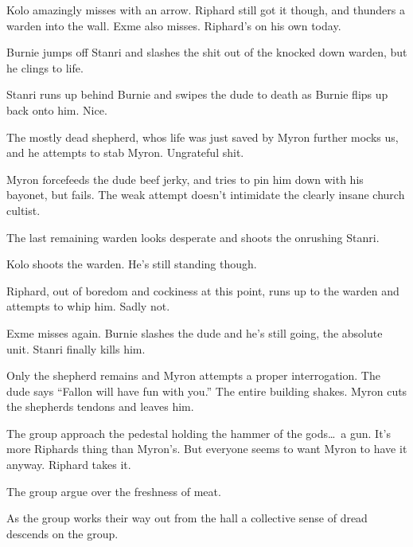 Kolo amazingly misses with an arrow. Riphard still got it though, and thunders a warden into the wall. Exme also misses. Riphard's on his own today.\medskip

Burnie jumps off Stanri and slashes the shit out of the knocked down warden, but he clings to life.\medskip

Stanri runs up behind Burnie and swipes the dude to death as Burnie flips up back onto him. Nice.\medskip

The mostly dead shepherd, whos life was just saved by Myron further mocks us, and he attempts to stab Myron. Ungrateful shit.\medskip

Myron forcefeeds the dude beef jerky, and tries to pin him down with his bayonet, but fails. The weak attempt doesn't intimidate the clearly insane church cultist.\medskip

The last remaining warden looks desperate and shoots the onrushing Stanri.\medskip

Kolo shoots the warden. He's still standing though.\medskip

Riphard, out of boredom and cockiness at this point, runs up to the warden and attempts to whip him. Sadly not.\medskip

Exme misses again. Burnie slashes the dude and he's still going, the absolute unit. Stanri finally kills him.\medskip

Only the shepherd remains and Myron attempts a proper interrogation. The dude says ``Fallon will have fun with you.'' The entire building shakes. Myron cuts the shepherds tendons and leaves him.\medskip

The group approach the pedestal holding the hammer of the gods\ldots\ a gun. It's more Riphards thing than Myron's. But everyone seems to want Myron to have it anyway. Riphard takes it.\medskip

The group argue over the freshness of meat.\medskip

As the group works their way out from the hall a collective sense of dread descends on the group.

\vspace*{5mm}
